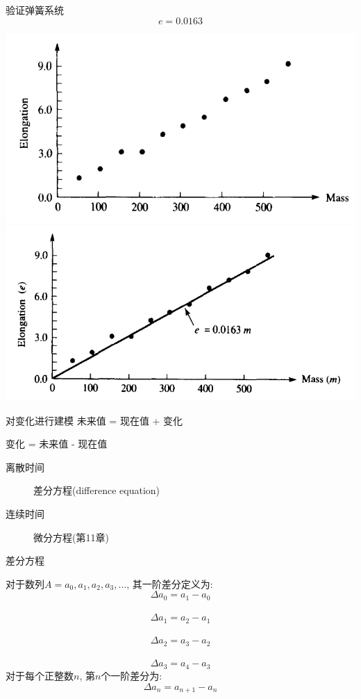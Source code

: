 \documentclass{beamer}
\begin{document}
\begin{frame}{验证弹簧系统}
  \[
  e = 0.0163
  \]

  \begin{center}
    \includegraphics[width=.4\textwidth{}]{spring-plot.png}
    \includegraphics[width=.4\textwidth{}]{spring-slope.png}
  \end{center}
\end{frame}

\begin{frame}{对变化进行建模}
  未来值 = 现在值 + 变化

  变化 = 未来值 - 现在值

  \begin{description}
  \item[离散时间] 差分方程(difference equation)
  \item[连续时间] 微分方程(第11章)
  \end{description}
  
\end{frame}

\begin{frame}{差分方程}

  \begin{definition}
    对于数列$A = {a_0, a_1, a_2, a_3, ...}$, 其一阶差分定义为:
    \[
    \Delta a_0 = a_1 - a_0
    \]\\[-25pt]
    \[
    \Delta a_1 = a_2 - a_1
    \]\\[-25pt]
    \[
    \Delta a_2 = a_3 - a_2
    \]\\[-25pt]
    \[
    \Delta a_3 = a_4 - a_3
    \]
    对于每个正整数$n$, 第$n$个一阶差分为:
    \[
    \Delta a_n = a_{n+1} - a_n
    \]
  \end{definition}
\end{frame}
\end{document}
